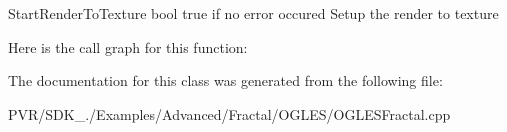   Start\+Render\+To\+Texture  bool true if no error occured  Setup the render to texture 

Here is the call graph for this function\+:




The documentation for this class was generated from the following file\+:\begin{DoxyCompactItemize}
\item 
P\+V\+R/\+S\+D\+K\+\_./\+Examples/\+Advanced/\+Fractal/\+O\+G\+L\+E\+S/O\+G\+L\+E\+S\+Fractal.\+cpp\end{DoxyCompactItemize}
